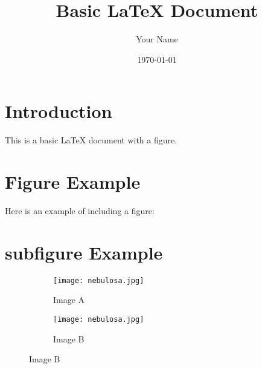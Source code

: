 \documentclass{article}
\begin{document}
\title{Basic LaTeX Document}
\author{Your Name}
\date{\today}

\maketitle

\section{Introduction}
This is a basic LaTeX document with a figure.

\section{Figure Example}
Here is an example of including a figure:

\section{subfigure Example}
\begin{figure}
    \centering
    \begin{subfigure}[b]{0.45\textwidth}
        \centering
        \texttt{[image: nebulosa.jpg]}
        \caption{Image A}\label{fig:a}
    \end{subfigure}
    \hfill
    \begin{subfigure}[b]{0.45\textwidth}
        \centering
        \texttt{[image: nebulosa.jpg]}
        \caption{Image B}\label{fig:b}
    \end{subfigure}
\end{figure}
\end{document}
